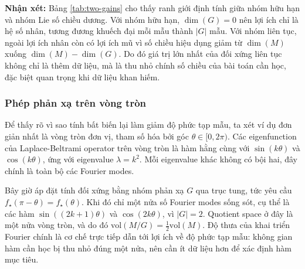 \textbf{Nhận xét:} Bảng \ref{tab:two-gains} cho thấy ranh giới định tính giữa nhóm hữu hạn và nhóm Lie số chiều dương. Với nhóm hữu hạn, $\dim(G)=0$ nên lợi ích chỉ là hệ số nhân, tương đương khuếch đại mỗi mẫu thành $|G|$ mẫu. Với nhóm liên tục, ngoài lợi ích nhân còn có lợi ích mũ vì số chiều hiệu dụng giảm từ $\dim(M)$ xuống $\dim(M)-\dim(G)$. Do đó giá trị lớn nhất của đối xứng liên tục không chỉ là thêm dữ liệu, mà là thu nhỏ chính số chiều của bài toán cần học, đặc biệt quan trọng khi dữ liệu khan hiếm.
 
\subsubsection{Phép phản xạ trên vòng tròn}
 
Để thấy rõ vì sao tính bất biến lại làm giảm độ phức tạp mẫu, ta xét ví dụ đơn giản nhất là vòng tròn đơn vị, tham số hóa bởi góc $\theta \in [0, 2\pi)$. Các eigenfunction của Laplace-Beltrami operator trên vòng tròn là hàm hằng cùng với $\sin(k\theta)$ và $\cos(k\theta)$, ứng với eigenvalue $\lambda = k^2$. Mỗi eigenvalue khác không có bội hai, đây chính là toàn bộ các Fourier modes.
 
Bây giờ áp đặt tính đối xứng bằng nhóm phản xạ $G$ qua trục tung, tức yêu cầu $f_{\star}(\pi - \theta) = f_{\star}(\theta)$. Khi đó chỉ một nửa số Fourier modes sống sót, cụ thể là các hàm $\sin((2k+1)\theta)$ và $\cos(2k\theta)$, vì $|G| = 2$. Quotient space ở đây là một nửa vòng tròn, và do đó $\mathrm{vol}(M/G) = \tfrac{1}{2}\mathrm{vol}(M)$. Độ thưa của khai triển Fourier chính là cơ chế trực tiếp dẫn tới lợi ích về độ phức tạp mẫu: không gian hàm cần học bị thu nhỏ đúng một nửa, nên cần ít dữ liệu hơn để xác định hàm mục tiêu.
 

